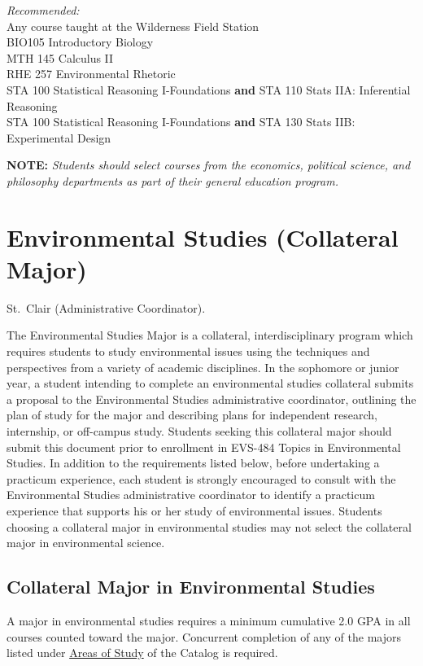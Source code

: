 \documentclass[
  letterpaper,
]{scrbook}
\begin{document}
\emph{Recommended:}\\
Any course taught at the Wilderness Field Station\\
BIO105 Introductory Biology\\
MTH 145 Calculus II\\
RHE 257 Environmental Rhetoric\\
STA 100 Statistical Reasoning I-Foundations \textbf{and} STA 110 Stats
IIA: Inferential Reasoning\\
STA 100 Statistical Reasoning I-Foundations \textbf{and} STA 130 Stats
IIB: Experimental Design

\textbf{NOTE:} \emph{Students should select courses from the economics,
political science, and philosophy departments as part of their general
education program.}

\section{Environmental Studies (Collateral
Major)}\label{sec-environmental-studies}

St.~Clair (Administrative Coordinator).

The Environmental Studies Major is a collateral, interdisciplinary
program which requires students to study environmental issues using the
techniques and perspectives from a variety of academic disciplines. In
the sophomore or junior year, a student intending to complete an
environmental studies collateral submits a proposal to the Environmental
Studies administrative coordinator, outlining the plan of study for the
major and describing plans for independent research, internship, or
off-campus study. Students seeking this collateral major should submit
this document prior to enrollment in EVS-484 Topics in Environmental
Studies. In addition to the requirements listed below, before
undertaking a practicum experience, each student is strongly encouraged
to consult with the Environmental Studies administrative coordinator to
identify a practicum experience that supports his or her study of
environmental issues. Students choosing a collateral major in
environmental studies may not select the collateral major in
environmental science.

\subsection{Collateral Major in Environmental
Studies}\label{collateral-major-in-environmental-studies}

A major in environmental studies requires a minimum cumulative 2.0 GPA
in all courses counted toward the major. Concurrent completion of any of
the majors listed under
\hyperref[Areasux5cux2520Ofux5cux2520Study]{Areas of Study} of the
Catalog is required.
\end{document}
